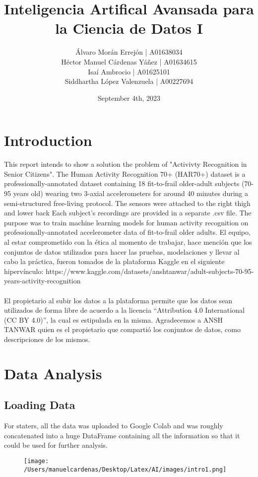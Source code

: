 \documentclass{article}
\title{Inteligencia Artifical Avansada para la Ciencia de Datos I}
\author{Álvaro Morán Errejón 		     | A01638034\\Héctor Manuel Cárdenas Yáñez	 | A01634615\\Isaí Ambrocio				     | A01625101\\Siddhartha López Valenzuela      | A00227694}
\date{September 4th, 2023}
\begin{document}
\maketitle

\section{Introduction}
This report intends to show a solution the problem of "Activivty Recognition in Senior Citizens". 
The Human Activity Recognition 70+ (HAR70+) dataset is a professionally-annotated dataset containing 18 fit-to-frail older-adult
 subjects (70-95 years old) wearing two 3-axial accelerometers for around 40 minutes during a semi-structured free-living protocol.
  The sensors were attached to the right thigh and lower back
Each subject's recordings are provided in a separate .csv file. The purpose was to train machine learning models for human activity 
recognition on professionally-annotated accelerometer data of fit-to-frail older adults. El equipo, al estar comprometido con la ética
 al momento de trabajar, hace mención que los conjuntos de datos utilizados para hacer las pruebas, modelaciones y llevar al cabo la
  práctica, fueron tomados de la plataforma Kaggle en el siguiente hipervínculo:
   https://www.kaggle.com/datasets/anshtanwar/adult-subjects-70-95-years-activity-recognition \\ \\
El propietario al subir los datos a la plataforma permite que los datos sean utilizados de forma libre de acuerdo a la licencia
 “Attribution 4.0 International (CC BY 4.0)”, la cual es estipulada en la misma. Agradecemos a ANSH TANWAR quien es el propietario
  que compartió los conjuntos de datos, como descripciones de los mismos.


\section{Data Analysis}
    \subsection{Loading Data}

    For staters, all the data was uploaded to Google Colab and was roughly concatenated into a huge DataFrame containing 
    all the information so that it could be used for further analysis. \pagebreak
    \begin{figure}[h]
        \centering
        \texttt{[image: /Users/manuelcardenas/Desktop/Latex/AI/images/intro1.png]}
        \label{fig:intro1}
    \end{figure}
\end{document}

